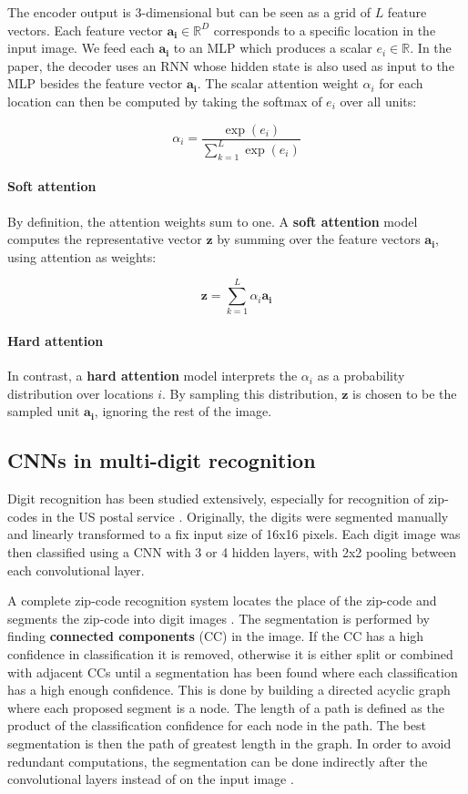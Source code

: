 The encoder output is 3-dimensional but can be seen as a grid of $L$ feature vectors. Each feature vector $\mathbf{a_i} \in \mathbb{R}^D$ corresponds to a specific location in the input image. We feed each $\mathbf{a_i}$ to an MLP which produces a scalar $e_i \in \mathbb{R}$. In the paper, the decoder uses an RNN whose hidden state is also used as input to the MLP besides the feature vector $\mathbf{a_i}$.
The scalar attention weight $\alpha_i$ for each location can then be computed by taking the softmax of $e_i$ over all units:

\[
\alpha_i = \frac{ \exp(e_i) }{ \sum_{k=1}^L \exp(e_i) }
\]

\paragraph{Soft attention}
By definition, the attention weights sum to one. A \textbf{soft attention} model computes the representative vector $\mathbf{z}$ by summing over the feature vectors $\mathbf{a_i}$, using attention as weights:

\[
\mathbf{z} = \sum_{k=1}^L \alpha_i \mathbf{a_i}
\]

\paragraph{Hard attention}
In contrast, a \textbf{hard attention} model interprets the ${\alpha_i}$ as a probability distribution over locations $i$. By sampling this distribution, $\mathbf{z}$ is chosen to be the sampled unit $\mathbf{a_i}$, ignoring the rest of the image.


\subsection{CNNs in multi-digit recognition}

Digit recognition has been studied extensively, especially for recognition of zip-codes in the US postal service \cite{lecun_1989, lecun_1990}. Originally, the digits were segmented manually and linearly transformed to a fix input size of 16x16 pixels.
Each digit image was then classified using a CNN with 3 or 4 hidden layers, with 2x2 pooling between each convolutional layer.

A complete zip-code recognition system locates the place of the zip-code and segments the zip-code into digit images \cite{zipcode_system}. The segmentation is performed by finding \textbf{connected components} (CC) in the image. If the CC has a high confidence in classification it is removed, otherwise it is either split or combined with adjacent CCs until a segmentation has been found where each classification has a high enough confidence. This is done by building a directed acyclic graph where each proposed segment is a node. The length of a path is defined as the product of the classification confidence for each node in the path. The best segmentation is then the path of greatest length in the graph. In order to avoid redundant computations, the segmentation can be done indirectly after the convolutional layers instead of on the input image \cite{lecun_multidigit}.

